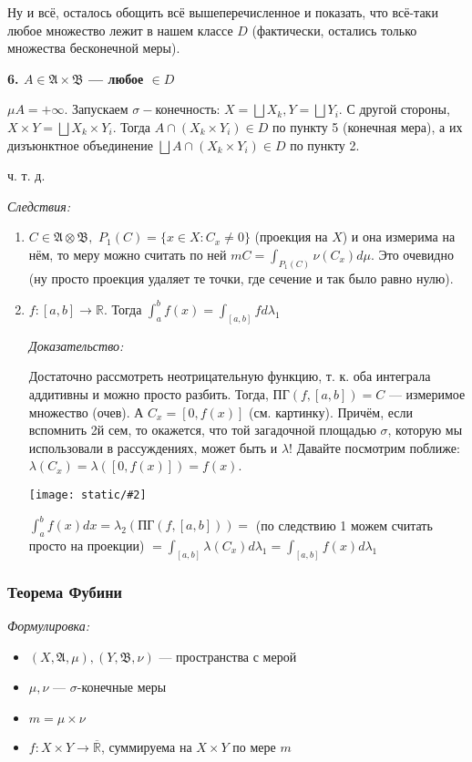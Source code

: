 \documentclass{article}
\def\dbl{\,\,}
\def\images#1#2{\begin{center}\texttt{[image: static/\#2]}\end{center}}
\def\rinf{\overline{\mathbb{R}}}
\begin{document}
Ну и всё, осталось обощить всё вышеперечисленное и показать, что всё-таки любое множество лежит в нашем классе $D$ (фактически, остались только множества бесконечной меры).

\textbf{6. $A \in \mathfrak{A} \times \mathfrak{B}$ --- любое $ \in D$}

$\mu A = +\infty$. Запускаем $\sigma-$конечность: $X = \bigsqcup X_k, Y = \bigsqcup Y_i$. С другой стороны, $X \times Y = \bigsqcup X_k \times Y_i$. Тогда $A \cap (X_k \times Y_i) \in D$ по пункту 5 (конечная мера), а их дизъюнктное объединение $\bigsqcup A \cap (X_k \times Y_i) \in D$ по пункту 2.

ч. т. д. 

\textit{Следствия:}

\begin{enumerate}
    \item $C \in \mathfrak{A} \otimes \mathfrak{B}, \dbl P_1(C) = \{x \in X: C_x \neq 0\}$ (проекция на $X$) и она измерима на нём, то меру можно считать по ней $mC = \int_{P_1(C)} \nu (C_x) d\mu$. Это очевидно (ну просто проекция удаляет те точки, где сечение и так было равно нулю).
    \item $f: [a, b] \rightarrow \mathbb{R}$. Тогда $\int_a^b f(x) = \int_{[a, b]} f d\lambda_1$
    
    \textit{Доказательство:}

    Достаточно рассмотреть неотрицательную функцию, т. к. оба интеграла аддитивны и можно просто разбить. Тогда, ПГ$(f, [a, b]) = C$ --- измеримое множество (очев). А $C_x = [0, f(x)]$ (см. картинку). Причём, если вспомнить 2й сем, то окажется, что той загадочной площадью $\sigma$, которую мы использовали в рассуждениях, может быть и $\lambda$! Давайте посмотрим поближе: $\lambda(C_x) = \lambda([0, f(x)]) = f(x)$.

    \images{0.3}{kavalieri.jpg}

    $\int_a^b f(x) dx = \lambda_2(\text{ПГ}(f, [a, b])) = $ (по следствию 1 можем считать просто на проекции) $= \int_{[a, b]} \lambda(C_x) d \lambda_1 = \int_{[a, b]} f(x) d\lambda_1$
\end{enumerate}

\subsubsection{Теорема Фубини}
\textit{Формулировка:}

\begin{itemize}
    \item $(X, \mathfrak{A}, \mu), (Y, \mathfrak{B}, \nu)$ --- пространства с мерой
    \item $\mu, \nu$ --- $\sigma$-конечные меры
    \item $m = \mu \times \nu$
    \item $f: X \times Y \rightarrow \rinf$, суммируема на $X \times Y$ по мере $m$
\end{itemize}
\end{document}
